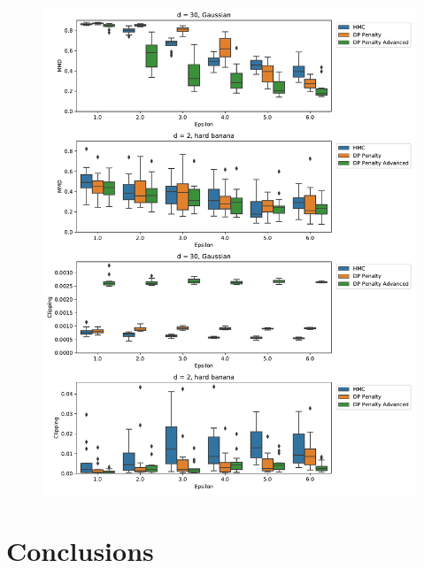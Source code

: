 \documentclass[english,twoside,openright]{HYgraduMLDS}
\begin{document}
\begin{figure}
  \centering
  \includegraphics[width=\textwidth]{figures/banana_extra.pdf}

  \label{banana_extra_mmd_fig}
\end{figure}



\chapter{Conclusions}
\end{document}
